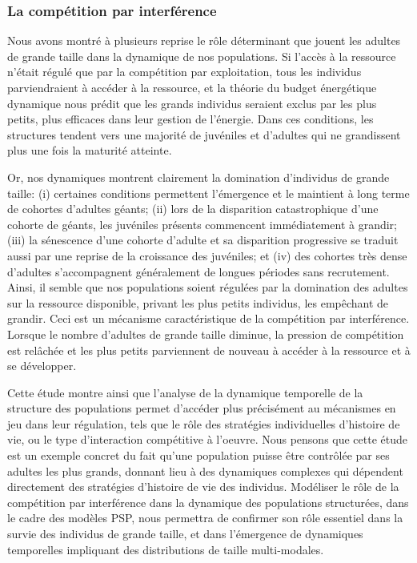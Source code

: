 \subsubsection{La compétition par interférence}

Nous avons montré à plusieurs reprise le rôle déterminant que jouent les adultes
de grande taille dans la dynamique de nos populations. Si l'accès à la ressource
n'était régulé que par la compétition par exploitation, tous les individus
parviendraient à accéder à la ressource, et la théorie du budget énergétique
dynamique nous prédit que les grands individus seraient exclus par les plus
petits, plus efficaces dans leur gestion de l'énergie. Dans ces conditions, les
structures tendent vers une majorité de juvéniles et d'adultes qui ne
grandissent plus une fois la maturité atteinte. 

Or, nos dynamiques montrent clairement la domination d'individus de grande
taille: (i) certaines conditions permettent l'émergence et le maintient à long
terme de cohortes d'adultes géants; (ii) lors de la disparition catastrophique
d'une cohorte de géants, les juvéniles présents commencent immédiatement à
grandir; (iii) la sénescence d'une cohorte d'adulte et sa disparition
progressive se traduit aussi par une reprise de la croissance des juvéniles; et
(iv) des cohortes très dense d'adultes s'accompagnent généralement de longues
périodes sans recrutement. Ainsi, il semble que nos populations soient régulées
par la domination des adultes sur la ressource disponible, privant les plus
petits individus, les empêchant de grandir. Ceci est un mécanisme
caractéristique de la compétition par interférence. Lorsque le nombre d'adultes
de grande taille diminue, la pression de compétition est relâchée et les plus
petits parviennent de nouveau à accéder à la ressource et à se développer. 

Cette étude montre ainsi que l'analyse de la dynamique temporelle de la
structure des populations permet d'accéder plus précisément au mécanismes en
jeu dans leur régulation, tels que le rôle des stratégies individuelles
d'histoire de vie, ou le type d'interaction compétitive à l'oeuvre. Nous pensons
que cette étude est un exemple concret du fait qu'une population puisse être
contrôlée par ses adultes les plus grands, donnant lieu à des dynamiques
complexes qui dépendent directement des stratégies d'histoire de vie des
individus. Modéliser le rôle de la compétition par interférence dans la
dynamique des populations structurées, dans le cadre des modèles PSP, nous
permettra de confirmer son rôle essentiel dans la survie des
individus de grande taille, et dans l'émergence de dynamiques temporelles
impliquant des distributions de taille multi-modales. 


